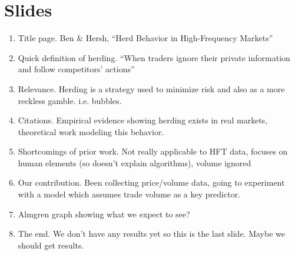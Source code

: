 \documentclass[11pt]{article}
\begin{document}

\setcounter{tocdepth}{3}
\vspace*{1cm}
\section*{Slides}
\label{sec-1}

\begin{enumerate}
\item Title page. Ben \& Hersh, ``Herd Behavior in High-Frequency Markets''
\item Quick definition of herding. ``When traders ignore their private information and follow competitors' actions''
\item Relevance. Herding is a strategy used to minimize risk and also as a more reckless gamble. i.e. bubbles.
\item Citations. Empirical evidence showing herding exists in real markets, theoretical work modeling this behavior.
\item Shortcomings of prior work. Not really applicable to HFT data, focuses on human elements (so doesn't explain algorithms), volume ignored
\item Our contribution. Been collecting price/volume data, going to experiment with a model which assumes trade volume as a key predictor.
\item Almgren graph showing what we expect to see?
\item The end. We don't have any results yet so this is the last slide. Maybe we should get results.
\end{enumerate}
\end{document}
